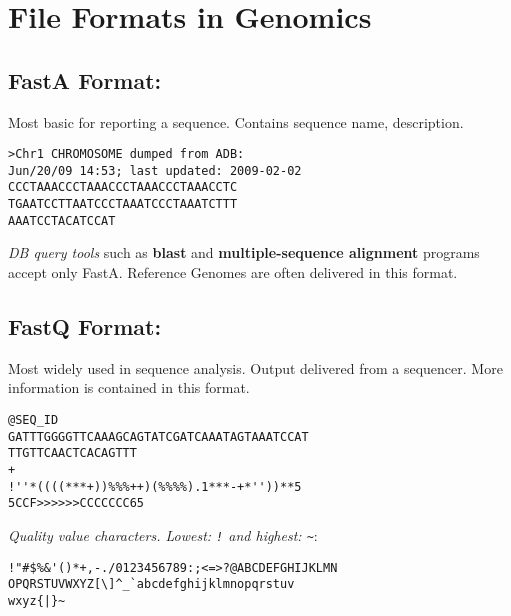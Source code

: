 \documentclass[../main.tex]{subfiles}
\begin{document}
\begin{center} %
\end{center}

\section{File Formats in Genomics}

\subsection*{FastA Format:} Most basic for reporting a sequence. Contains sequence name, description.
\begin{verbatim}
>Chr1 CHROMOSOME dumped from ADB:
Jun/20/09 14:53; last updated: 2009-02-02
CCCTAAACCCTAAACCCTAAACCCTAAACCTC
TGAATCCTTAATCCCTAAATCCCTAAATCTTT
AAATCCTACATCCAT
\end{verbatim}
\textit{DB query tools} such as \textbf{blast} and \textbf{multiple-sequence alignment} programs accept only FastA. Reference Genomes are often delivered in this format.

\subsection*{FastQ Format:} Most widely used in sequence analysis. Output delivered from a sequencer. More information is contained in this format.
\begin{verbatim}
@SEQ_ID
GATTTGGGGTTCAAAGCAGTATCGATCAAATAGTAAATCCAT
TTGTTCAACTCACAGTTT
+
!''*((((***+))%%%++)(%%%%).1***-+*''))**5
5CCF>>>>>>CCCCCCC65
\end{verbatim}
\textit{Quality value characters. Lowest: \texttt{!} and highest: \texttt{\textasciitilde{}}}:
\begin{verbatim}
!"#$%&'()*+,-./0123456789:;<=>?@ABCDEFGHIJKLMN
OPQRSTUVWXYZ[\]^_`abcdefghijklmnopqrstuv
wxyz{|}~
\end{verbatim}
\end{document}
